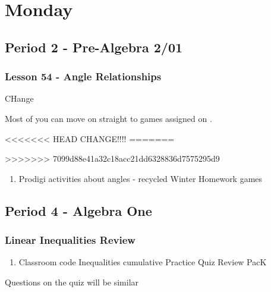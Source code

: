    \section[Mon]{Monday}
   \subsection[PA2/01]{Period 2 - Pre-Algebra 2/01}
   \begin{frame}[label=PA2_01]
   	\frametitle{Lesson 54 - Angle Relationships}

    CHange

   \begin{alertblock}{}
   	Most of you can move on straight to  games assigned on \mangahightext. \\
   \end{alertblock}
<<<<<<< HEAD
      CHANGE!!!!
=======

>>>>>>> 7099d88e41a32c18acc21dd6328836d7575295d9
      \begin{enumerate}
        \item \mangahightext
        \rightarrowitem Prodigi activities about angles - recycled Winter Homework
        \rightarrowitem {} games
      \end{enumerate}
   	  \end{frame}

     \subsection[ALG]{Period 4 - Algebra One}
   	 \begin{frame}[label=ALG1]
   	 	\frametitle{Linear Inequalities Review}

      \begin{enumerate}
   	    \item {} Classroom code 
        \rightarrowitem Inequalities cumulative Practice
        \rightarrowitem Quiz Review PacK
      \end{enumerate}

      \begin{alertblock}{}
        Questions on the quiz will be similar
     \end{alertblock}
   	  \end{frame}

